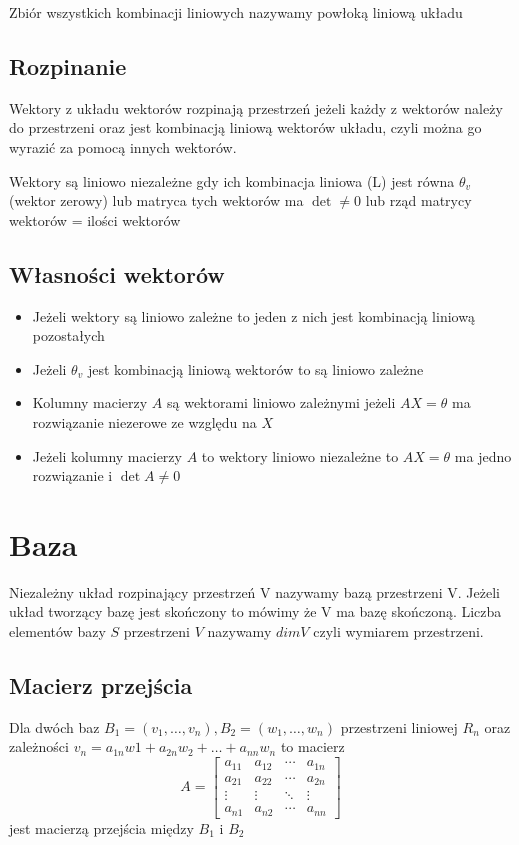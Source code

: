 \documentclass{../notatki}
\begin{document}
Zbiór wszystkich kombinacji liniowych nazywamy powłoką liniową układu

\subsection{Rozpinanie}

Wektory z układu wektorów rozpinają przestrzeń jeżeli każdy z
wektorów należy do przestrzeni oraz jest kombinacją liniową wektorów
układu, czyli można go wyrazić za pomocą innych wektorów.

Wektory są liniowo niezależne gdy ich kombinacja liniowa (L) jest
równa $\theta_v$(wektor zerowy) lub matryca tych wektorów ma $\det
\ne 0$ lub rząd matrycy wektorów = ilości wektorów

\subsection{Własności wektorów}

\begin{itemize}
  \item Jeżeli wektory są liniowo zależne to jeden z nich jest
    kombinacją liniową pozostałych
  \item Jeżeli $\theta_v$ jest kombinacją liniową wektorów to są liniowo zależne
  \item Kolumny macierzy $A$ są wektorami liniowo zależnymi jeżeli
    $AX = \theta$ ma rozwiązanie niezerowe ze względu na $X$
  \item Jeżeli kolumny macierzy $A$ to wektory liniowo niezależne to
    $AX = \theta$ ma jedno rozwiązanie i $\det A \ne 0$
\end{itemize}

\section{Baza}

Niezależny układ rozpinający przestrzeń V nazywamy bazą przestrzeni
V. Jeżeli układ tworzący bazę jest skończony to mówimy że V ma
bazę skończoną. Liczba elementów bazy $S$ przestrzeni $V$ nazywamy $dim V$ czyli
wymiarem przestrzeni.

\subsection{Macierz przejścia}

Dla dwóch baz $B_1= (v_1, \dots, v_n), B_2 = (w_1, \dots, w_n)$ przestrzeni
liniowej $R_n$ oraz zależności $v_n = a_{1n}w1 + a_{2n}w_2 + \dots + a_{nn}w_n$
to macierz
$$
A =
\begin{bmatrix}
  a_{11} & a_{12} & \cdots & a_{1n} \\
  a_{21} & a_{22} & \cdots & a_{2n} \\
  \vdots & \vdots & \ddots & \vdots\\
  a_{n1} & a_{n2} & \cdots & a_{nn}
\end{bmatrix}
$$
jest macierzą przejścia między $B_1$ i $B_2$
\end{document}
